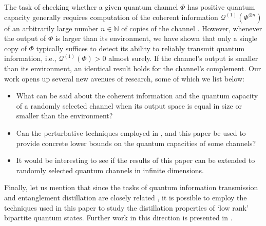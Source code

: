 \documentclass[a4paper,onecolumn,10pt,accepted=2022-07-11]{quantumarticle}
\theoremstyle{definition}
\begin{document}
The task of checking whether a given quantum channel $\Phi$ has positive quantum capacity generally requires computation of the coherent information $ \mathcal{Q}^{(1)}(\Phi^{\otimes n})$
of an arbitrarily large number $n\in\mathbb{N}$ of copies of the channel \cite{Cubitt2015unbounded}. However, whenever the output of $\Phi$ is larger than its environment, we have shown that only a single copy of $\Phi$ typically suffices to detect its ability to reliably transmit quantum information, i.e., $\mathcal{Q}^{(1)}(\Phi)>0$ almost surely. If the channel's output is smaller than its environment, an identical result holds for the channel's complement. Our work opens up several new avenues of research, some of which we list below:
\begin{itemize}
    \item What can be said about the 
    coherent information and the quantum capacity of a randomly selected channel when its output space is equal in size or smaller than the environment?
    \item Can the perturbative techniques employed in \cite{siddhu2020logsingularities, Singh2022detecting}, and this paper be used to provide concrete lower bounds on the quantum capacities of some channels?
    \item It would be interesting to see if the results of this paper can be extended to randomly selected quantum channels in infinite dimensions.
\end{itemize}

Finally, let us mention that since the tasks of quantum information transmission and entanglement distillation are closely related \cite{Bennett1996distillationQECC}, it is possible to employ the techniques used in this paper to study the distillation properties of `low rank' bipartite quantum states. Further work in this direction is presented in \cite{singh2022fully}. 



\bigskip

\appendix
\end{document}
